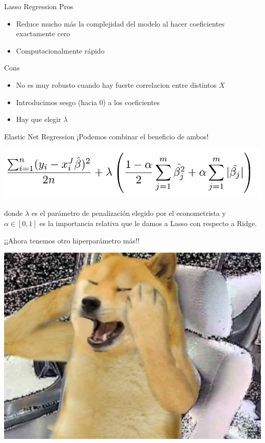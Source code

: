 \documentclass[11pt,handout,aspectratio=169]{beamer}
\begin{document}
\begin{frame}{Lasso Regression}
Pros
\begin{itemize}
\item Reduce mucho más la complejidad del modelo al hacer coeficientes exactamente cero
\item Computacionalmente rápido
\end{itemize}
\vspace{0.8cm}
Cons 
\begin{itemize}
\item No es muy robusto cuando hay fuerte correlacion entre distintos $X$
\item Introducimos sesgo (hacia 0) a los coeficientes
\item Hay que elegir $\lambda$
\end{itemize}

\end{frame}




\begin{frame}{Elastic Net Regression}
¡Podemos combinar el beneficio de ambos!
\begin{center}
\includegraphics[scale=0.3]{Elastic_1.png}
\end{center}
donde $\lambda$ es el parámetro de penalización elegido por el econometrista y $\alpha \in [0,1]$ es la importancia relativa que le damos a Lasso con respecto a Ridge.
\vspace{0.8cm}

¡¡Ahora tenemos otro hiperparámetro más!!
\begin{center}
\includegraphics[scale=0.2]{doge_headache.jpg}
\end{center}
\end{frame}
\end{document}
